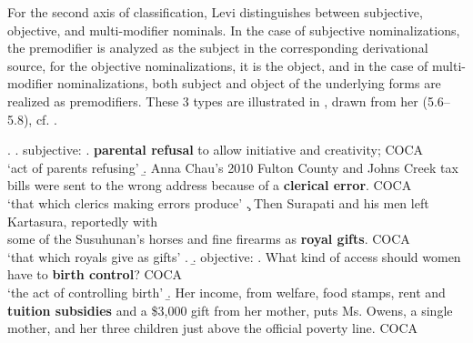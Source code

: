 For the second axis of classification, Levi distinguishes between subjective,
objective, and multi-modifier nominals. In the case of subjective
nominalizations, the premodifier is analyzed as the subject in the
corresponding derivational source, for the objective nominalizations, it is
the object, and in the case of multi-modifier nominalizations, both subject
and object of the underlying forms are realized as premodifiers. These 3
types are illustrated in \Next, drawn from
her (5.6--5.8), cf. \citet[173--174]{Levi:1978}.

\enlargethispage{1\baselineskip}
\ex. \a. subjective: 
\a.  \label{ex:parental_refusal}%
\textbf{parental refusal} to allow initiative and creativity; COCA
\\`act of parents refusing'
\b. \label{ex:clerical_error}
Anna Chau's 2010 Fulton County and Johns Creek tax bills were sent
to the wrong address because of a \textbf{clerical error}. COCA
\\ `that which clerics making errors produce'
\c. \label{ex:royal_gifts}
Then Surapati and his men left Kartasura, reportedly with\\ some of
the Susuhunan's horses and fine firearms as \textbf{royal gifts}. COCA
\\`that which royals give as gifts'
\z. 
\b. objective:
\a. \label{ex:birth_control}
What kind of access should women have to \textbf{birth control}? COCA
\\`the act of controlling birth'
\b. \label{ex:tuition_subsidies}
Her income, from welfare, food stamps, rent and \textbf{tuition subsidies}
and a \$3,000 gift from her mother, puts Ms. Owens, a single mother,
and her three children just above the official poverty line. COCA
